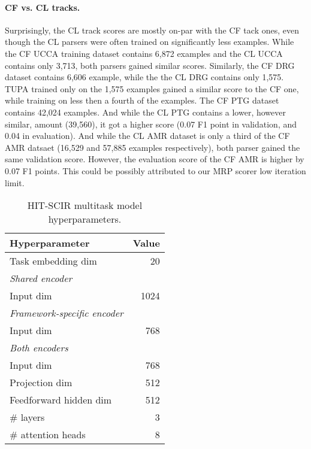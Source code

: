\documentclass[11pt,a4paper]{article}
\begin{document}
\paragraph{CF vs. CL tracks.}

Surprisingly, the CL track scores are mostly on-par with the CF tack ones, even though the CL parsers were often trained on significantly less examples. While the CF UCCA training dataset contains 6,872 examples and the CL UCCA contains only 3,713, both parsers gained similar scores. Similarly, the CF DRG dataset contains 6,606 example, while the the CL DRG contains only 1,575. TUPA trained only on the 1,575 examples gained a similar score to the CF one, while training on less then a fourth of the examples.
The CF PTG dataset contains 42,024 examples. And while the CL PTG contains a lower, however similar, amount (39,560), it got a higher score (0.07 F1 point in validation, and 0.04 in evaluation). And while the CL AMR dataset is only a third of the CF AMR datsaet (16,529 and 57,885 examples respectively), both parser gained the same validation score. However, the evaluation score of the CF AMR is higher by 0.07 F1 points. This could be possibly attributed to our MRP scorer low iteration limit. 








\begin{table}[t]
\centering
\begin{tabular}{lr}
\multicolumn{1}{l}{\textbf{Hyperparameter}}                                     & \multicolumn{1}{l}{\textbf{Value}} \\ \hline
Task embedding dim                                                                & 20                                  \\ \hline
\textit{Shared encoder} \\
Input dim               & 1024                                \\ \hline
\textit{Framework-specific encoder} \\
Input dim            & 768                                 \\ \hline
\textit{Both encoders} \\
Input dim               & 768 \\
Projection dim         & 512 \\
Feedforward hidden dim  & 512 \\
\# layers & 3                                   \\
\# attention heads & 8  
\end{tabular}
\caption{HIT-SCIR multitask model hyperparameters.}
\label{tab:Multitask}
\end{table}
\end{document}
